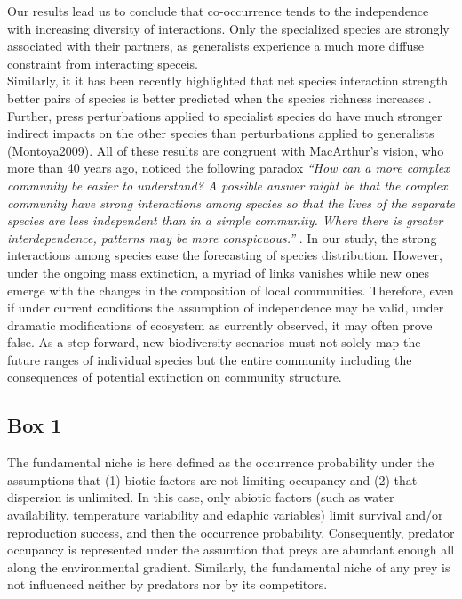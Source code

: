 Our results lead us to conclude that co-occurrence tends to the
independence with increasing diversity of interactions. Only the
specialized species are strongly associated with their partners, as
generalists experience a much more diffuse constraint from interacting
speceis.\\
Similarly, it it has been recently highlighted that net species
interaction strength better pairs of species is better predicted when
the species richness increases \citep{Berlow2009}. Further, press
perturbations applied to specialist species do have much stronger
indirect impacts on the other species than perturbations applied to
generalists (Montoya2009). All of these results are congruent with
MacArthur's vision, who more than 40 years ago, noticed the following
paradox \emph{``How can a more complex community be easier to
understand? A possible answer might be that the complex community have
strong interactions among species so that the lives of the separate
species are less independent than in a simple community. Where there is
greater interdependence, patterns may be more conspicuous.''}
\citep[p.199]{macarthur1972geographical}. In our study, the strong
interactions among species ease the forecasting of species distribution.
However, under the ongoing mass extinction, a myriad of links vanishes
while new ones emerge with the changes in the composition of local
communities. Therefore, even if under current conditions the assumption
of independence may be valid, under dramatic modifications of ecosystem
as currently observed, it may often prove false. As a step forward, new
biodiversity scenarios must not solely map the future ranges of
individual species but the entire community including the consequences
of potential extinction on community structure.

\newpage

\subsection{Box 1}\label{box-1}

The fundamental niche is here defined as the occurrence probability
under the assumptions that (1) biotic factors are not limiting occupancy
and (2) that dispersion is unlimited. In this case, only abiotic factors
(such as water availability, temperature variability and edaphic
variables) limit survival and/or reproduction success, and then the
occurrence probability. Consequently, predator occupancy is represented
under the assumtion that preys are abundant enough all along the
environmental gradient. Similarly, the fundamental niche of any prey is
not influenced neither by predators nor by its competitors.

